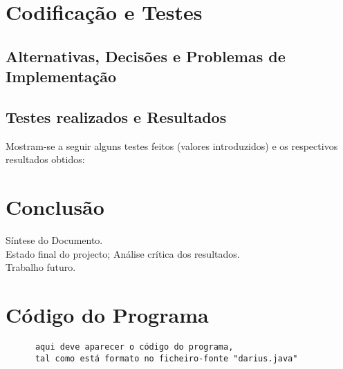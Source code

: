 \documentclass{report}
\begin{document}
\chapter{Codificação e Testes} \label {code}
\section{Alternativas, Decisões e Problemas de Implementação}
\section{Testes realizados e Resultados}
Mostram-se a seguir alguns testes feitos (valores introduzidos) e
os respectivos resultados obtidos:


\chapter{Conclusão} \label {conc}
Síntese do Documento.\\
Estado final do projecto; Análise crítica dos resultados.\\
Trabalho futuro.

\appendix
\chapter{Código do Programa}


\begin{verbatim}
      aqui deve aparecer o código do programa,
      tal como está formato no ficheiro-fonte "darius.java"
\end{verbatim}
\end{document}
